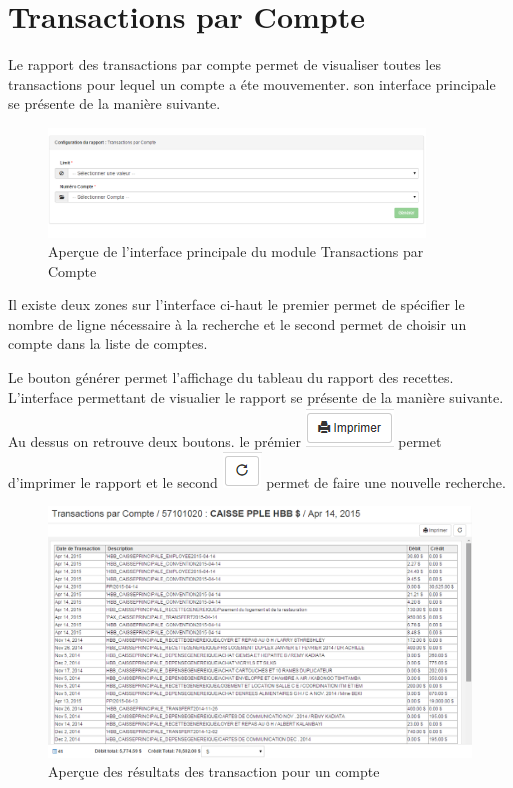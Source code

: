 \documentclass[12pt,a4paper]{report}
\begin{document}
\newpage
\section{Transactions par Compte}
Le rapport des transactions par compte permet de visualiser toutes les transactions pour lequel un compte a éte mouvementer. son interface principale se présente de la manière suivante. 

\begin{figure}[h]
\begin{center}
\includegraphics[width=10cm]{pic/TransacCompte.png}
\end{center}
\caption{Aperçue de l'interface principale du module Transactions par Compte}
\label{Aperçue de l'interface principale du module Transactions par Compte}
\end{figure}


Il existe deux zones sur l'interface ci-haut le premier permet de spécifier le nombre de ligne nécessaire à la recherche et le second permet de choisir un compte dans la liste de comptes.

Le bouton générer permet l'affichage du tableau du rapport des  recettes. L'interface permettant de visualier le rapport se présente de la manière suivante. Au dessus on retrouve deux boutons. le prémier 
\includegraphics[scale=0.7]{pic/Print.png} permet d'imprimer le rapport et le second \includegraphics[scale=0.7]{pic/refresh.png} permet de faire une nouvelle recherche.

\begin{figure}[h]
\begin{center}
\includegraphics[width=12cm]{pic/TraByAccount.png}
\end{center}
\caption{Aperçue des résultats des transaction pour un compte}
\label{Aperçue des résultats des transaction pour un compte}
\end{figure}
\end{document}
